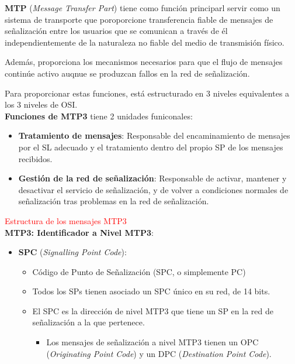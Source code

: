 \documentclass[10pt,portrait, twocolumn]{article}
\begin{document}
\textbf{MTP} (\textit{Message Transfer Part}) tiene como función principarl servir como un sistema de transporte que poroporcione transferencia fiable de mensajes de señalización entre los usuarios que se comunican a través de él independientemente de la naturaleza no fiable del medio de transmisión físico.

	\quad Además, proporciona los mecanismos necesarios para que el flujo de mensajes continúe activo auqnue se produzcan fallos en la red de señalización.
	
	\quad Para proporcionar estas funciones, está estructurado en 3 niveles equivalentes a los 3 niveles de OSI.\\
	
\textbf{Funciones de MTP3} tiene 2 unidades funiconales:
	
	\begin{itemize}
	\item \textbf{Tratamiento de mensajes}: Responsable del encaminamiento de mensajes por el SL adecuado y el tratamiento dentro del propio SP de los mensajes recibidos.
	\item \textbf{Gestión de la red de señalización}: Responsable de activar, mantener y desactivar el servicio de señalización, y de volver a condiciones normales de señalización tras problemas en la red de señalización.
	\end{itemize}

\textcolor{red}{Estructura de los mensajes MTP3}\\

\textbf{MTP3: Identificador a Nivel MTP3}:

	\begin{itemize}
	\item \textbf{SPC} (\textit{Signalling Point Code}):
		\begin{itemize}
		\item Código de Punto de Señalización (SPC, o simplemente PC)
		\item Todos los SPs tienen asociado un SPC único en su red, de 14 bits.
		\item El SPC es la dirección de nivel MTP3 que tiene un SP en la red de señalización a la que pertenece.
			\begin{itemize}
			\item Los mensajes de señalización a nivel MTP3 tienen un OPC (\textit{Originating Point Code}) y un DPC (\textit{Destination Point Code}).
			\end{itemize}
		\end{itemize}
	\end{itemize}
\end{document}

